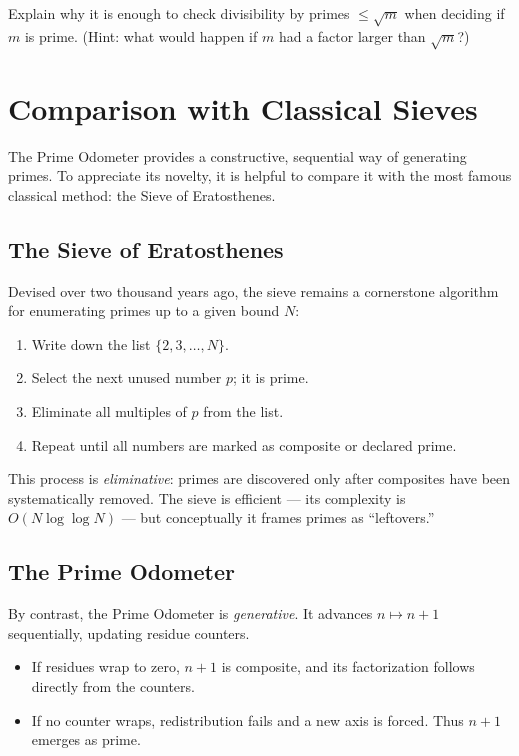 \documentclass[11pt]{article}
\theoremstyle{definition}
\begin{document}
\begin{studentexercise}
Explain why it is enough to check divisibility by primes $\leq \sqrt{m}$ 
when deciding if $m$ is prime. 
(Hint: what would happen if $m$ had a factor larger than $\sqrt{m}$?)
\end{studentexercise}

\section{Comparison with Classical Sieves}

The Prime Odometer provides a constructive, sequential way of generating primes. 
To appreciate its novelty, it is helpful to compare it with the most famous 
classical method: the Sieve of Eratosthenes. 

\subsection{The Sieve of Eratosthenes}

Devised over two thousand years ago, the sieve remains a cornerstone algorithm 
for enumerating primes up to a given bound $N$:

\begin{enumerate}
  \item Write down the list $\{2,3,\dots,N\}$.
  \item Select the next unused number $p$; it is prime.
  \item Eliminate all multiples of $p$ from the list.
  \item Repeat until all numbers are marked as composite or declared prime.
\end{enumerate}

This process is \emph{eliminative}: primes are discovered only after composites 
have been systematically removed. The sieve is efficient --- its complexity is 
$O(N \log\log N)$ --- but conceptually it frames primes as ``leftovers.''

\subsection{The Prime Odometer}

By contrast, the Prime Odometer is \emph{generative}. 
It advances $n \mapsto n+1$ sequentially, updating residue counters. 
\begin{itemize}
  \item If residues wrap to zero, $n+1$ is composite, and its factorization 
        follows directly from the counters.
  \item If no counter wraps, redistribution fails and a new axis is forced. 
        Thus $n+1$ emerges as prime.
\end{itemize}
\end{document}
